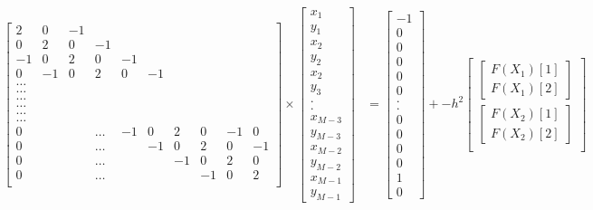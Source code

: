 \documentclass[twoside,12pt]{article}
\begin{document}
\begin{align*}
\begin{bmatrix}
2&0&-1\\
0&2&0&-1\\
-1&0&2&0&-1\\
0&-1&0&2&0&-1\\
\dots\\
\dots\\
\dots\\
\dots\\
\dots\\
\dots\\
0&&&\dots&-1&0&2&0&-1&0\\
0&&&\dots&&-1&0&2&0&-1\\
0&&&\dots&&&-1&0&2&0\\
0&&&\dots&&&&-1&0&2\\
\end{bmatrix}
 \times \begin{bmatrix}
x_1\\y_1\\x_2\\y_2\\x_2\\y_3\\.\\.\\x_{M-3}\\y_{M-3}\\x_{M-2}\\y_{M-2}\\x_{M-1}\\y_{M-1}\end{bmatrix} &=  \begin{bmatrix}
-1\\0\\0\\0\\0\\0\\.\\.\\0\\0\\0\\0\\1\\0\end{bmatrix} + -h^2 \begin{bmatrix} \begin{bmatrix}F(X_1)[1]\\F(X_1)[2]\end{bmatrix} \\
\begin{bmatrix}F(X_2)[1]\\F(X_2)[2]\end{bmatrix}\\

\end{bmatrix}
\end{align*}
\end{document}
